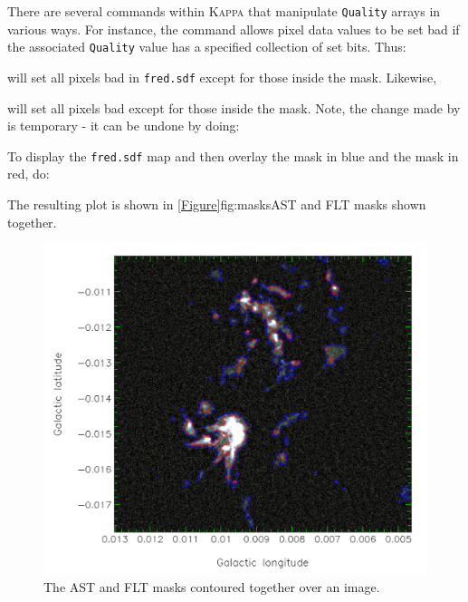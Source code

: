 
There are several commands within \textsc{Kappa} that manipulate
\texttt{Quality} arrays in various ways. For instance, the
 command allows pixel data values to
be set bad if the associated \texttt{Quality} value has a specified
collection of set bits. Thus:

\begin{terminalv}
\end{terminalv}

will set all pixels bad in \texttt{fred.sdf} except for those inside the
 mask. Likewise,

\begin{terminalv}
\end{terminalv}

will set all pixels bad except for those inside the  mask.  Note, the
change made by  is temporary - it can be undone by doing:

\begin{terminalv}
\end{terminalv}

To display the \texttt{fred.sdf} map and then overlay the  mask in blue
and the  mask in red, do:

\begin{terminalv}
\end{terminalv}

The resulting plot is shown in \cref{Figure}{fig:masks}{AST and FLT masks
shown together}.

\begin{figure}[t!]
\includegraphics[width=0.6\linewidth]{sc21_masks}
\caption[AST and FLT masks shown together]{The AST and FLT masks contoured
together over an image.}
\label{fig:masks}
\end{figure}

